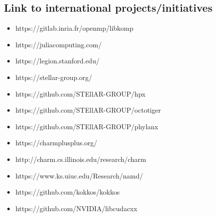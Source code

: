\documentclass{article}
\begin{document}
\subsection*{Link to international projects/initiatives}
\begin{itemize}
    \item https://gitlab.inria.fr/openmp/libkomp
    \item https://juliacomputing.com/
    \item https://legion.stanford.edu/
    \item https://stellar-group.org/
    \item https://github.com/STEllAR-GROUP/hpx
    \item https://github.com/STEllAR-GROUP/octotiger
    \item https://github.com/STEllAR-GROUP/phylanx
    \item https://charmplusplus.org/
    \item http://charm.cs.illinois.edu/research/charm
    \item https://www.ks.uiuc.edu/Research/namd/
    \item https://github.com/kokkos/kokkos
    \item https://github.com/NVIDIA/libcudacxx
\end{itemize}
\end{document}
